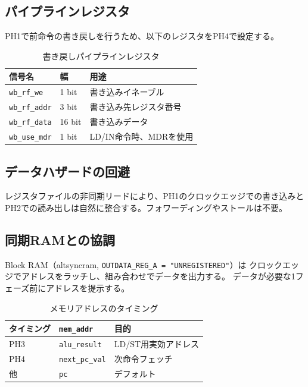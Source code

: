 \documentclass[a4paper,11pt]{ltjsarticle}
\begin{document}
\subsection{パイプラインレジスタ}

PH1で前命令の書き戻しを行うため、以下のレジスタをPH4で設定する。

\begin{table}[h]
\centering
\caption{書き戻しパイプラインレジスタ}
\begin{tabular}{lll}
\toprule
信号名 & 幅 & 用途 \\
\midrule
\texttt{wb\_rf\_we}   & 1 bit  & 書き込みイネーブル \\
\texttt{wb\_rf\_addr} & 3 bit  & 書き込み先レジスタ番号 \\
\texttt{wb\_rf\_data} & 16 bit & 書き込みデータ \\
\texttt{wb\_use\_mdr} & 1 bit  & LD/IN命令時、MDRを使用 \\
\bottomrule
\end{tabular}
\end{table}

\subsection{データハザードの回避}

レジスタファイルの非同期リードにより、PH1のクロックエッジでの書き込みと
PH2での読み出しは自然に整合する。フォワーディングやストールは不要。

\subsection{同期RAMとの協調}

Block RAM（altsyncram, \texttt{OUTDATA\_REG\_A = "UNREGISTERED"}）は
クロックエッジでアドレスをラッチし、組み合わせでデータを出力する。
データが必要な1フェーズ前にアドレスを提示する。

\begin{table}[h]
\centering
\caption{メモリアドレスのタイミング}
\begin{tabular}{lll}
\toprule
タイミング & \texttt{mem\_addr} & 目的 \\
\midrule
PH3 & \texttt{alu\_result} & LD/ST用実効アドレス \\
PH4 & \texttt{next\_pc\_val} & 次命令フェッチ \\
他  & \texttt{pc} & デフォルト \\
\bottomrule
\end{tabular}
\end{table}
\end{document}
